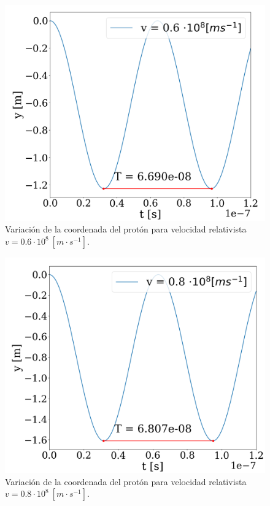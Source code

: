 \documentclass[journal]{IEEEtran}
\begin{document}
\bigskip
\bigskip
\bigskip
\bigskip
\bigskip
\bigskip
\bigskip

\begin{figure}[!htb]
    \centering
    \includegraphics[width=\linewidth]{freq_rel_t_2.png}
    \caption{Variación de la coordenada del protón para velocidad relativista $v = 0.6\cdot 10^8~[m\cdot s^{-1}]$.}
    \label{fig:freqrelt2}
\end{figure}

\hfill

\newpage

\hfill

\begin{figure}[!htb]
    \centering
    \includegraphics[width=\linewidth]{freq_rel_t_3.png}
    \caption{Variación de la coordenada del protón para velocidad relativista $v = 0.8\cdot 10^8~[m\cdot s^{-1}]$.}
    \label{fig:freqrelt3}
\end{figure}
\end{document}
